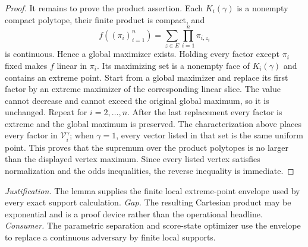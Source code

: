 \documentclass{article}
\begin{document}
\begin{proof}
It remains to prove the product assertion. Each \(K_i(\gamma)\) is a nonempty compact polytope, their finite product is compact, and
\[
f((\pi_i)_{i=1}^n)=\sum_{z\in E}\prod_{i=1}^n\pi_{i,z_i}
\]
is continuous. Hence a global maximizer exists. Holding every factor except \(\pi_i\) fixed makes \(f\) linear in \(\pi_i\). Its maximizing set is a nonempty face of \(K_i(\gamma)\) and contains an extreme point. Start from a global maximizer and replace its first factor by an extreme maximizer of the corresponding linear slice. The value cannot decrease and cannot exceed the original global maximum, so it is unchanged. Repeat for \(i=2,\ldots,n\). After the last replacement every factor is extreme and the global maximum is preserved. The characterization above places every factor in \(\mathcal V_i^\gamma\); when \(\gamma=1\), every vector listed in that set is the same uniform point. This proves that the supremum over the product polytopes is no larger than the displayed vertex maximum. Since every listed vertex satisfies normalization and the odds inequalities, the reverse inequality is immediate.
\end{proof}
\par\smallskip\noindent \textit{Justification.} The lemma supplies the finite local extreme-point envelope used by every exact support calculation. \textit{Gap.} The resulting Cartesian product may be exponential and is a proof device rather than the operational headline. \textit{Consumer.} The parametric separation and score-state optimizer use the envelope to replace a continuous adversary by finite local supports.
\end{document}
